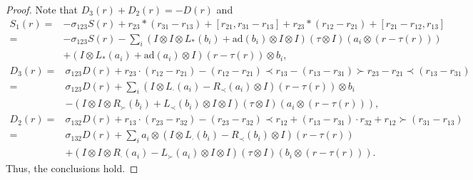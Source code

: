 \documentclass[12pt]{amsart}
\theoremstyle{definition}
\begin{document}
\begin{proof}
Note that $D_3(r)+D_2(r)=-D(r)$ and
\begin{align*}S_{1}(r)=&-\sigma_{123}S(r)+r_{23}\ast (r_{31}-r_{13})
+[r_{21},r_{31}-r_{13}]+r_{23}\ast (r_{12}-r_{21})+[r_{21}-r_{12},r_{13}]
\\=&-\sigma_{123}S(r)-\sum_{i}(I\otimes I\otimes L_{\ast}(b_i)
+\mathrm{ad}(b_i)\otimes I\otimes I)(\tau\otimes I)(a_i\otimes (r-\tau(r)))
\\&+(I\otimes L_{\ast}(a_i)+\mathrm{ad}(a_i)\otimes I) (r-\tau(r))\otimes b_i,\end{align*} 
\begin{align*} D_3(r)=&\sigma_{123}D(r)+r_{23}\cdot (r_{12}-r_{21})-(r_{12}-r_{21})\prec r_{13}
-(r_{13}-r_{31})\succ r_{23}-r_{21}\prec(r_{13}-r_{31})
\\=&\sigma_{123}D(r)+\sum_{i}(I\otimes L_{\cdot}(a_i)-R_{\prec}(a_i)\otimes I)(r-\tau(r))\otimes b_i\\&-(I\otimes I\otimes R_{\succ}(b_i)
+L_{\prec}(b_i)\otimes I\otimes I)
(\tau\otimes I)(a_i\otimes (r-\tau(r))),
\end{align*} 
\begin{align*} D_2(r)=&\sigma_{132}D(r)+r_{13}\cdot (r_{23}-r_{32})-(r_{23}-r_{32})\prec r_{12}+(r_{13}-r_{31})\cdot r_{32}+
r_{12}\succ (r_{31}-r_{13})
\\=&\sigma_{132}D(r)+\sum_{i}a_i\otimes
(I\otimes L_{\cdot}(b_i)-R_{\prec}(b_i)\otimes I)(r-\tau(r))\\&+(I\otimes I\otimes R_{\cdot}(a_i)
-L_{\succ}(a_i)\otimes I\otimes I)(\tau\otimes I)(b_i\otimes (r-\tau(r))).
\end{align*} 
Thus, the conclusions hold.
\end{proof}
\end{document}
